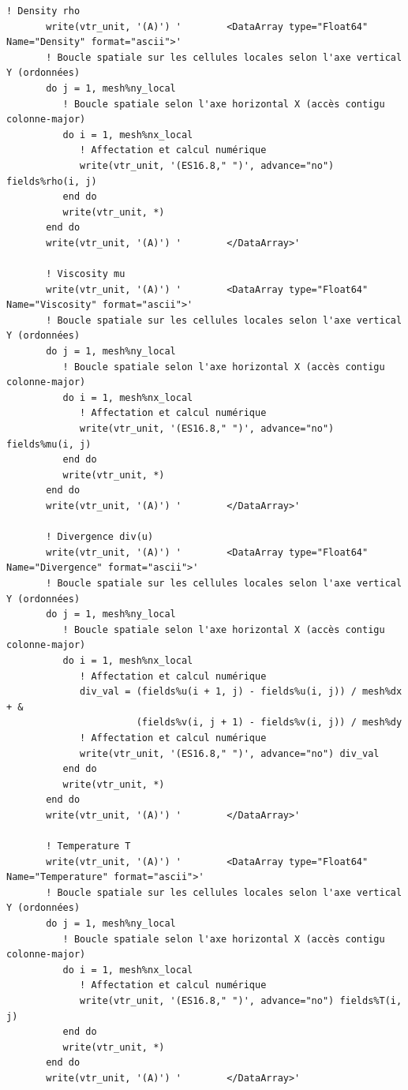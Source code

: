 \documentclass[10pt,a4paper,oneside]{book}
\begin{document}
\begin{lstlisting}[language={[95]Fortran}]
       ! Density rho
       write(vtr_unit, '(A)') '        <DataArray type="Float64" Name="Density" format="ascii">'
       ! Boucle spatiale sur les cellules locales selon l'axe vertical Y (ordonnées)
       do j = 1, mesh%ny_local
          ! Boucle spatiale selon l'axe horizontal X (accès contigu colonne-major)
          do i = 1, mesh%nx_local
             ! Affectation et calcul numérique
             write(vtr_unit, '(ES16.8," ")', advance="no") fields%rho(i, j)
          end do
          write(vtr_unit, *)
       end do
       write(vtr_unit, '(A)') '        </DataArray>'

       ! Viscosity mu
       write(vtr_unit, '(A)') '        <DataArray type="Float64" Name="Viscosity" format="ascii">'
       ! Boucle spatiale sur les cellules locales selon l'axe vertical Y (ordonnées)
       do j = 1, mesh%ny_local
          ! Boucle spatiale selon l'axe horizontal X (accès contigu colonne-major)
          do i = 1, mesh%nx_local
             ! Affectation et calcul numérique
             write(vtr_unit, '(ES16.8," ")', advance="no") fields%mu(i, j)
          end do
          write(vtr_unit, *)
       end do
       write(vtr_unit, '(A)') '        </DataArray>'

       ! Divergence div(u)
       write(vtr_unit, '(A)') '        <DataArray type="Float64" Name="Divergence" format="ascii">'
       ! Boucle spatiale sur les cellules locales selon l'axe vertical Y (ordonnées)
       do j = 1, mesh%ny_local
          ! Boucle spatiale selon l'axe horizontal X (accès contigu colonne-major)
          do i = 1, mesh%nx_local
             ! Affectation et calcul numérique
             div_val = (fields%u(i + 1, j) - fields%u(i, j)) / mesh%dx + &
                       (fields%v(i, j + 1) - fields%v(i, j)) / mesh%dy
             ! Affectation et calcul numérique
             write(vtr_unit, '(ES16.8," ")', advance="no") div_val
          end do
          write(vtr_unit, *)
       end do
       write(vtr_unit, '(A)') '        </DataArray>'

       ! Temperature T
       write(vtr_unit, '(A)') '        <DataArray type="Float64" Name="Temperature" format="ascii">'
       ! Boucle spatiale sur les cellules locales selon l'axe vertical Y (ordonnées)
       do j = 1, mesh%ny_local
          ! Boucle spatiale selon l'axe horizontal X (accès contigu colonne-major)
          do i = 1, mesh%nx_local
             ! Affectation et calcul numérique
             write(vtr_unit, '(ES16.8," ")', advance="no") fields%T(i, j)
          end do
          write(vtr_unit, *)
       end do
       write(vtr_unit, '(A)') '        </DataArray>'


\end{lstlisting}
\end{document}
